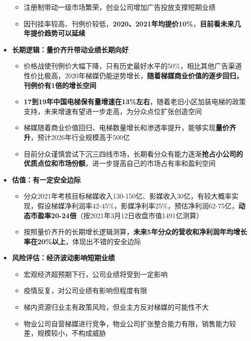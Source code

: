 \begin{itemize}[leftmargin=*]
{\begin{itemize}
        \item 注册制带动一级市场繁荣，创业公司增加广告投放支撑短期业绩
        \item 因刊挂率较高、刊例价较低，\textbf{2020、2021年均提价10\%}，\textbf{目前看未来几年提价趋势可以延续}
      \end{itemize}
      }
    \item
      \textbf{长期逻辑：量价齐升带动业绩长期向好}
      {\small
      \begin{itemize}
        \item 价格战使刊例价大幅下降，只有历史最好水平的50\%，相比其他广告渠道性价比极高，2020年梯媒仍能逆势增长，\textbf{随着梯媒商业价值的逐步回归，刊例价有1倍的增长空间}
        \item \textbf{17到19年中国电梯保有量增速在13\%左右}，随着老旧小区加装电梯的政策支持，未来增速有望进一步走高，为分众点位扩张创造空间
        \item 梯媒随着商业价值回归、电梯数量增长和渗透率提升，能够实现\textbf{量价齐升}，预计2026年行业规模高于500亿
        \item 目前分众谨慎尝试下沉三四线市场，长期看分众有能力逐渐\textbf{抢占小公司的优质点位和市场份额}，进一步提高自己的市场占有率和盈利空间
      \end{itemize}
      }
      \item
      \textbf{估值：有一定安全边际}
      {\small
      \begin{itemize}
        \item 分众2021年考核目标梯媒收入130-150亿、影媒收入30亿，有较大概率实现，假设梯媒净利润率42-45\%，影媒净利率25\%，预估净利润62-75亿，\textbf{动态市盈率20-24倍}（按2021年3月12日收盘市值1491亿测算）
        \item 按照量价齐升的长期增长逻辑测算，\textbf{未来5年分众的营收和净利润年均增长率在20\%以上}，体现出不错的安全边际
      \end{itemize}
      }
      \item
      \textbf{风险评估：经济波动影响短期业绩}
      {\small
      \begin{itemize}
        \item 宏观经济超预期下行，公司业绩将受到一定影响
        \item 疫情反复，对公司业绩有影响但程度有限
        \item 梯内资源归业主有政策风险，但业主方反对梯媒的可能性不大
        \item 物业公司自营梯媒进行竞争，物业公司扩张整合能力有限，销售能力较差，规模较小，不构成威胁
      \end{itemize}
      }
  \end{itemize}